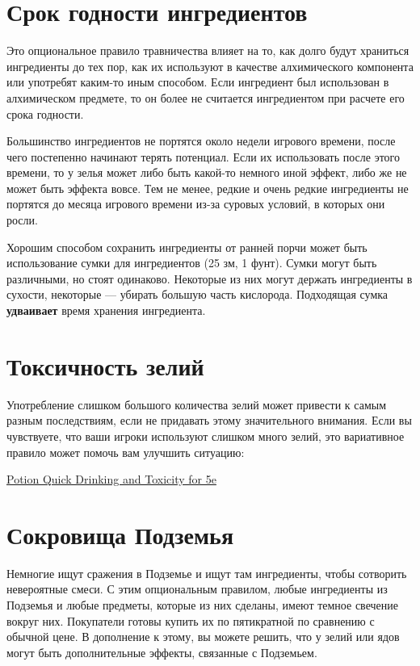 \documentclass[a4paper, 9pt, twocolumn]{book}
\begin{document}
	\section{Срок годности ингредиентов}
	
	Это опциональное правило травничества влияет на то, как долго будут храниться ингредиенты до тех пор, как их используют в качестве алхимического компонента или употребят каким-то иным способом. Если ингредиент был использован в алхимическом предмете, то он более не считается ингредиентом при расчете его срока годности.
	
	Большинство ингредиентов не портятся около недели игрового времени, после чего постепенно начинают терять потенциал. Если их использовать после этого времени, то у зелья может либо быть какой-то немного иной эффект, либо же не может быть эффекта вовсе. Тем не менее, редкие и очень редкие ингредиенты не портятся до месяца игрового времени из-за суровых условий, в которых они росли.
	
	Хорошим способом сохранить ингредиенты от ранней порчи может быть использование сумки для ингредиентов (25 зм, 1 фунт). Сумки могут быть различными, но стоят одинаково. Некоторые из них могут держать ингредиенты в сухости, некоторые --- убирать большую часть кислорода. Подходящая сумка \textbf{удваивает} время хранения ингредиента.
	
	\section{Токсичность зелий}
	
	Употребление слишком большого количества зелий может привести к самым разным последствиям, если не придавать этому значительного внимания. Если вы чувствуете, что ваши игроки используют слишком много зелий, это вариативное правило может помочь вам улучшить ситуацию: 
	
	\href{https://homebrewery.naturalcrit.com/share/n1MAVZSD}{Potion Quick Drinking and Toxicity for 5e}	
	
	\section{Сокровища Подземья}
	
	Немногие ищут сражения в Подземье и ищут там ингредиенты, чтобы сотворить невероятные смеси. С этим опциональным правилом, любые ингредиенты из Подземья и любые предметы, которые из них сделаны, имеют темное свечение вокруг них. Покупатели готовы купить их по пятикратной по сравнению с обычной цене. В дополнение к этому, вы можете решить, что у зелий или ядов могут быть дополнительные эффекты, связанные с Подземьем.
	
\end{document}
